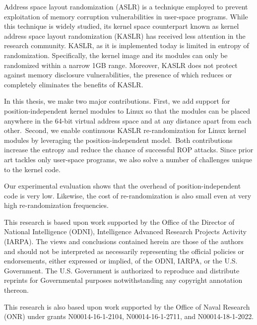 Address space layout randomization (ASLR) is a technique employed to prevent exploitation of memory corruption vulnerabilities in user-space programs. While this technique is widely studied, its kernel space counterpart known as kernel address space layout randomization (KASLR) has received less attention in the research community. KASLR, as it is implemented today is limited in entropy of randomization. Specifically, the kernel image and its modules can only be randomized within a narrow 1GB range. 
Moreover, KASLR does not protect against memory disclosure vulnerabilities, the presence of which reduces or completely eliminates the benefits of KASLR.

In this thesis, we make two major contributions.
First, we add support for position-independent kernel modules to Linux so that the modules can be placed anywhere in the 64-bit virtual address space and at any distance apart from each other.\ssrgContribution~Second, we enable continuous KASLR re-randomization for Linux kernel modules by leveraging the position-independent model.\ssrgEvolution~Both contributions increase the entropy and reduce the chance of successful ROP attacks. Since prior art tackles only user-space programs, we also solve a number of challenges unique to the kernel code.

Our experimental evaluation shows that the overhead of position-independent code is very low. Likewise, the cost of re-randomization is also small even at very high re-randomization frequencies.

\vspace*{\fill}
This research is based upon work supported by the Office of the Director of National Intelligence (ODNI), Intelligence Advanced Research Projects Activity (IARPA). The views and conclusions contained herein are those of the authors and should not be interpreted as necessarily representing the official policies or endorsements, either expressed or implied, of the ODNI, IARPA, or the U.S. Government. The U.S. Government is authorized to reproduce and distribute reprints for Governmental purposes notwithstanding any copyright annotation thereon.

This research is also based upon work supported by the Office of Naval Research (ONR) under grants N00014-16-1-2104, N00014-16-1-2711, and N00014-18-1-2022.